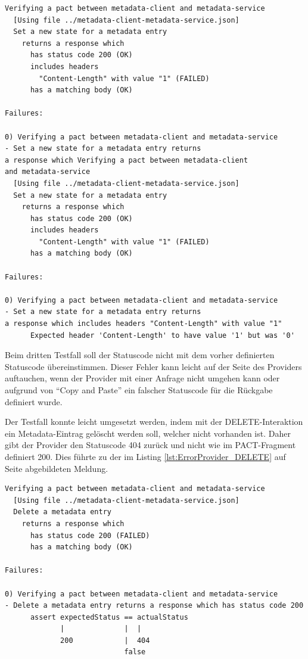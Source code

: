 \documentclass{llncs}
\begin{document}
\begin{lstlisting}[caption=Test,label={lst:ErrorProvider_PUT}]
Verifying a pact between metadata-client and metadata-service
  [Using file ../metadata-client-metadata-service.json]
  Set a new state for a metadata entry
    returns a response which
      has status code 200 (OK)
      includes headers
        "Content-Length" with value "1" (FAILED)
      has a matching body (OK)

Failures:

0) Verifying a pact between metadata-client and metadata-service 
- Set a new state for a metadata entry returns 
a response which Verifying a pact between metadata-client 
and metadata-service
  [Using file ../metadata-client-metadata-service.json]
  Set a new state for a metadata entry
    returns a response which
      has status code 200 (OK)
      includes headers
        "Content-Length" with value "1" (FAILED)
      has a matching body (OK)

Failures:

0) Verifying a pact between metadata-client and metadata-service 
- Set a new state for a metadata entry returns 
a response which includes headers "Content-Length" with value "1"
      Expected header 'Content-Length' to have value '1' but was '0'
\end{lstlisting}
      
Beim dritten Testfall soll der Statuscode nicht mit dem vorher definierten Statuscode übereinstimmen. Dieser Fehler kann leicht auf der Seite des Providers auftauchen, wenn der Provider mit einer Anfrage nicht umgehen kann oder aufgrund von \enquote{Copy and Paste} ein falscher Statuscode für die Rückgabe definiert wurde. 

Der Testfall konnte leicht umgesetzt werden, indem mit der DELETE-Interaktion ein Metadata-Eintrag gelöscht werden soll, welcher nicht vorhanden ist. Daher gibt der Provider den Statuscode 404 zurück und nicht wie im PACT-Fragment definiert 200. Dies führte zu der im Listing \ref{lst:ErrorProvider_DELETE} auf Seite \pageref{lst:ErrorProvider_DELETE} abgebildeten Meldung.  

\begin{lstlisting}[caption=Test,label={lst:ErrorProvider_DELETE}]
Verifying a pact between metadata-client and metadata-service
  [Using file ../metadata-client-metadata-service.json]
  Delete a metadata entry
    returns a response which
      has status code 200 (FAILED)
      has a matching body (OK)

Failures:

0) Verifying a pact between metadata-client and metadata-service 
- Delete a metadata entry returns a response which has status code 200
      assert expectedStatus == actualStatus
             |              |  |
             200            |  404
                            false
\end{lstlisting}
\end{document}
